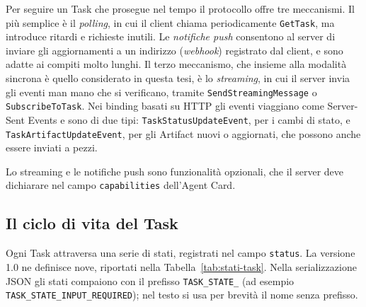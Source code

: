 Per seguire un Task che prosegue nel tempo il protocollo offre tre meccanismi. Il più semplice è il \emph{polling}, in cui il client chiama periodicamente \texttt{GetTask}, ma introduce ritardi e richieste inutili. Le \emph{notifiche push} consentono al server di inviare gli aggiornamenti a un indirizzo (\emph{webhook}) registrato dal client, e sono adatte ai compiti molto lunghi. Il terzo meccanismo, che insieme alla modalità sincrona è quello considerato in questa tesi, è lo \emph{streaming}, in cui il server invia gli eventi man mano che si verificano, tramite \texttt{Send\allowbreak Streaming\allowbreak Message} o \texttt{Subscribe\allowbreak To\allowbreak Task}. Nei binding basati su HTTP gli eventi viaggiano come Server-Sent Events e sono di due tipi: \texttt{Task\allowbreak Status\allowbreak Update\allowbreak Event}, per i cambi di stato, e \texttt{Task\allowbreak Artifact\allowbreak Update\allowbreak Event}, per gli Artifact nuovi o aggiornati, che possono anche essere inviati a pezzi.

Lo streaming e le notifiche push sono funzionalità opzionali, che il server deve dichiarare nel campo \texttt{capabilities} dell'Agent Card.

\subsection{Il ciclo di vita del Task}

Ogni Task attraversa una serie di stati, registrati nel campo \texttt{status}. La versione 1.0 ne definisce nove, riportati nella Tabella~\ref{tab:stati-task}. Nella serializzazione JSON gli stati compaiono con il prefisso \texttt{TASK\_STATE\_} (ad esempio \texttt{TASK\_\allowbreak STATE\_\allowbreak INPUT\_\allowbreak REQUIRED}); nel testo si usa per brevità il nome senza prefisso.

